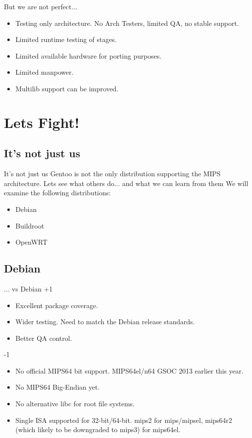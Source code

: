\documentclass{beamer}
\begin{document}
\begin{frame}{But we are not perfect...}
	\begin{itemize}
		\item Testing only architecture. No Arch Testers, limited QA, no stable support.
		\item Limited runtime testing of stages.
		\item Limited available hardware for porting purposes.
		\item Limited manpower.
		\item Multilib support can be improved.
	\end{itemize}
\end{frame}


\section{Lets Fight{!}}

\subsection{It's not just us}
\begin{frame}{It's not just us}
	Gentoo is not the only distribution supporting the MIPS architecture.
	\newline\newline
	Lets see what others do... and what we can learn from them
	\newline
	We will examine the following distributions:
	\begin{itemize}
		\item Debian
		\item Buildroot
		\item OpenWRT
	\end{itemize}
\end{frame}

\subsection{Debian}
\begin{frame}{... vs Debian}
+1
	\begin{itemize}
		\item Excellent package coverage.
		\item Wider testing. Need to match the Debian release standards.
		\item Better QA control.
	\end{itemize}
-1
	\begin{itemize}
		\item No official MIPS64 bit support. MIPS64el/n64 GSOC 2013 earlier this year.
		\item No MIPS64 Big-Endian yet.
		\item No alternative libc for root file systems.
		\item Single ISA supported for 32-bit/64-bit. mips2 for mips/mipsel, mips64r2 (which likely to be downgraded to mips3) for mips64el.
	\end{itemize}
\end{frame}
\end{document}
